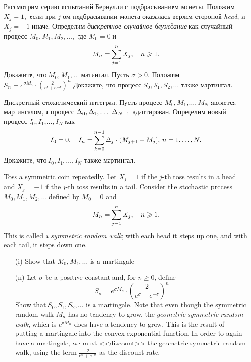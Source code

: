 \begin{problem}
 Рассмотрим серию испытаний Бернулли с подбрасыванием монеты. Положим $X_j=1,$ 
  если при $j$-ом подбрасывании монета оказалась верхом стороной \emph{head}, и 
  $X_j=-1$ иначе. Определим \emph{дискретное случайное блуждание} как 
  случайный процесс $M_0,M_1,M_2,\dots,$ где $M_0=0$ и
\[
  M_n=\sum\limits_{j=1}^{n} X_j,\quad n\geqslant 1.
\]
  \ni Докажите, что $M_0,M_1,\dots$ матингал. Пусть $\sigma>0.$ 
  Положим $S_n=e^{\sigma M_n}\cdot\left(\frac{2}{e^{\sigma}+e^{-\sigma}} \right)^n$
  \ni Докажите, что процесс $S_0,S_1,S_2,\dots$ также мартингал.
\end{problem} 
\begin{solution} 

\end{solution}

\begin{problem}
 Дискретный стохастический интеграл. Пусть процесс $M_0,M_1,\dots,M_N$ является
  мартингалом, а процесс $\Delta_0,\Delta_1,\dots,\Delta_{N-1}$ адаптирован. Определим новый процесс
  $I_0,I_1,\dots,I_N$ как
 \[
  I_0=0,\quad I_n=\sum\limits_{k=0}^{n-1} \Delta_j\cdot (M_{j+1}-M_j),\, n=1,\dots,N.
\]
  \ni Докажите, что $I_0,I_1,\dots,I_N$ также мартингал. 
\end{problem} 
\begin{solution} 

\end{solution}

\begin{problem}
 Toss a symmetric coin repeatedly. Let $X_j=1$ if the $j$-th toss
results in a head and $X_j=-1$ if the $j$-th toss results in a tail. Consider the
stochastic process $M_0,M_1,M_2,\dots$ defined by $M_0=0$ and
\[
M_n=\sum\limits_{j=1}^{n} X_j,\quad n\geqslant 1.
\]
\ni This is called a \emph{symmetric random walk}; with each head it steps up one,
and with each tail, it steps down one.

\begin{itemize}
\item[(i)] Show that $M_0,M_1,\dots$ is a martingale

\item[(ii)] Let $\sigma$ be a positive constant and, for $n\ge 0$, define
\[
S_n=e^{\sigma M_n}\cdot\left(\frac{2}{e^{\sigma}+e^{-\sigma}} \right)^n
\]
\ni Show that $S_0,S_1,S_2,\dots$ is a martingale. Note that even though the symmetric random
walk $M_n$ has no tendency to grow, the \emph{geometric symmetric random walk}, which is
$e^{\sigma M_n}$ does have a tendency to grow. This is the result of putting a martingale into
the convex exponential function. In order to again have a martingale, we must <<discount>> the
geometric symmetric random walk, using the term  $\frac{2}{e^{\sigma}+e^{-\sigma}}$ as the discount rate.
\end{itemize}
\end{problem} 
\begin{solution} 

\end{solution}

